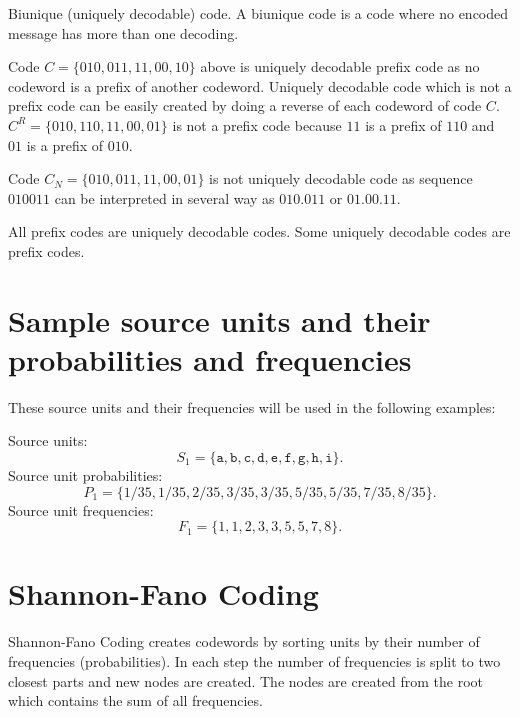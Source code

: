 \begin{dt}{Biunique (uniquely decodable) code.}
  A biunique code is a code where no encoded message has more than one decoding.
\end{dt}

Code $C = \{010, 011, 11, 00, 10\}$ above is uniquely decodable prefix code as no codeword is a prefix of another codeword. Uniquely decodable code which is not a prefix code can be easily created by doing a reverse of each codeword of code $C$. $C^R = \{010, 110, 11, 00, 01\}$ is not a prefix code because $11$ is a prefix of $110$ and $01$ is a prefix of $010$.

Code $C_N = \{010, 011, 11, 00, 01\}$ is not uniquely decodable code as sequence $010011$ can be interpreted in several way as $010.011$ or $01.00.11$.

All prefix codes are uniquely decodable codes. Some uniquely decodable codes are prefix codes.

\section{Sample source units and their probabilities and frequencies}

These source units and their frequencies will be used in the following examples:

\noindent
Source units:
$$S_1 = \{\texttt{a}, \texttt{b}, \texttt{c}, \texttt{d}, \texttt{e}, \texttt{f}, \texttt{g}, \texttt{h}, \texttt{i}\}.$$
Source unit probabilities:
$$P_1 = \{1/35, 1/35, 2/35, 3/35, 3/35, 5/35, 5/35, 7/35, 8/35\}.$$
Source unit frequencies:
$$F_1 = \{1, 1, 2, 3, 3, 5, 5, 7, 8\}.$$


\section{Shannon-Fano Coding}
Shannon-Fano Coding creates codewords by sorting units by their number of frequencies (probabilities). In each step the number of frequencies is split to two closest parts and new nodes are created. The nodes are created from the root which contains the sum of all frequencies.

